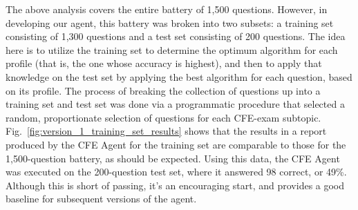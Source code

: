  
\begin{table}[h!]
\centering
\caption{Hypothesis Test for Multiple-Choice Questions}
\small
{}
\label{table:hypothesis_test_for_multiple_choice_questions}
\end{table}


The above analysis covers the entire battery of 1,500 questions.  However, in developing our agent, this battery was broken into two subsets:  a training set consisting of 1,300 questions and a test set consisting of 200 questions.  The idea here is to utilize the training set to determine the optimum algorithm for each profile (that is, the one whose accuracy is highest), and then to apply that knowledge on the test set by applying the best algorithm for each question, based on its profile.  The process of breaking the collection of questions up into a training set and test set was done via a programmatic procedure that selected a random, proportionate selection of questions for each CFE-exam subtopic.  Fig.~\ref{fig:version_1_training_set_results} shows that the results in a report produced by the CFE Agent for the training set are comparable to those for the 1,500-question battery, as should be expected.  Using this data, the CFE Agent was executed on the 200-question test set, where it answered 98 correct, or 49\%.  Although this is short of passing, it's an encouraging start, and provides a good baseline for subsequent versions of the agent.

